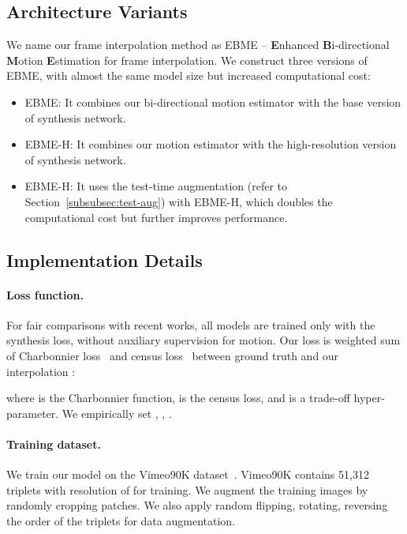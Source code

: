 \documentclass[10pt,twocolumn,letterpaper]{article}
\begin{document}
\subsection{Architecture Variants} We name our frame interpolation method as
EBME -- \textbf{E}nhanced \textbf{B}i-directional \textbf{M}otion
\textbf{E}stimation for frame interpolation. We construct three versions of
EBME, with almost the same model size but increased computational cost:
\begin{itemize}
    \item EBME: It combines our bi-directional motion estimator with the base
        version of synthesis network. 
    \item EBME-H: It combines our motion estimator with the high-resolution
        version of synthesis network.
    \item EBME-H: It uses the test-time augmentation (refer to
        Section~\ref{subsubsec:test-aug}) with EBME-H, which doubles the
        computational cost but further improves performance.
\end{itemize}



\subsection{Implementation Details}

\paragraph{Loss function.} For fair comparisons with recent works, all models
are trained only with the synthesis loss, without auxiliary supervision for
motion. Our loss is weighted sum of Charbonnier loss~\cite{charbonnier1994two}
and census loss~\cite{meister2018unflow} between ground truth  and our
interpolation :

where  is the Charbonnier function,
 is the census loss, and  is a trade-off hyper-parameter. We
empirically set , , .


\paragraph{Training dataset.} We train our model on the Vimeo90K
dataset~\cite{xue2019video}. Vimeo90K contains 51,312 triplets with resolution
of  for training. We augment the training images by randomly
cropping  patches. We also apply random flipping, rotating,
reversing the order of the triplets for data augmentation.
\end{document}
